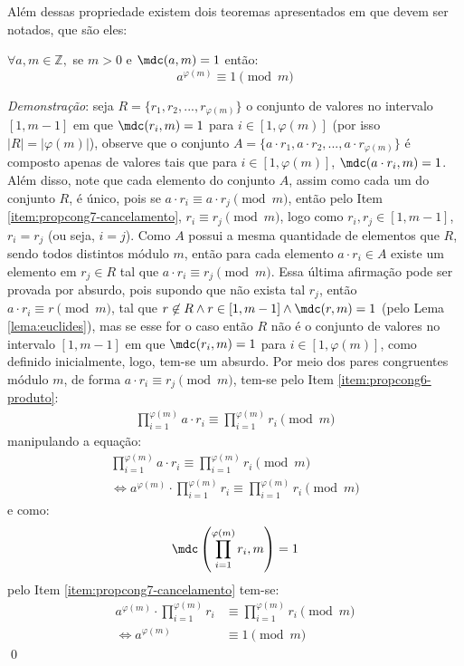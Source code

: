 Além dessas propriedade existem dois teoremas apresentados em \cite[p.~49-50]{book:2399854} que devem ser notados, que são eles:

\begin{teorema}
\label{eq : euler-fermat}
$\forall a, m \in \mathbb{Z},$ se  $ m > 0$  e $\mdc(a,m) = 1$ então:
    \begin{equation*}
        a^{\varphi(m)} \equiv 1 \pmod{m}
    \end{equation*}
\end{teorema}

\noindent
\textit{Demonstração}: seja $R = \{r_1, r_2, ..., r_{\varphi(m)}\}$ o conjunto de valores no intervalo $[1, m-1]$ em que $\mdc(r_i, m) = 1$ para $i \in [1, \varphi(m)]$ (por isso $|R| = |\varphi(m)|$), observe que o conjunto $A = \{a \cdot r_1, a \cdot r_2, ..., a \cdot r_{\varphi(m)}\}$ é composto apenas de valores tais que para $i \in [1, \varphi(m)]$, $\mdc(a \cdot r_i, m) = 1$. Além disso, note que cada elemento do conjunto $A$, assim como cada um do conjunto $R$, é único, pois se $a \cdot r_i \equiv a \cdot r_j \pmod{m}$, então pelo Item \ref{item:propcong7-cancelamento}, $r_i \equiv r_j \pmod{m}$, logo como $r_i, r_j \in [1, m-1]$, $r_i = r_j$ (ou seja, $i = j$). Como $A$ possui a mesma quantidade de elementos que $R$, sendo todos distintos módulo $m$, então para cada elemento $a \cdot r_i \in A$ existe um elemento em $r_j \in R$ tal que $a \cdot r_i \equiv r_j \pmod{m}$. Essa última afirmação pode ser provada por absurdo, pois supondo que não exista tal $r_j$, então $a \cdot r_i \equiv r \pmod{m}$, tal que $r \not\in R \land r \in [1, m-1] \land \mdc(r, m) = 1$ (pelo Lema \ref{lema:euclides}), mas se esse for o caso então $R$ não é o conjunto de valores no intervalo $[1, m-1]$ em que $\mdc(r_i, m) = 1$ para $i \in [1, \varphi(m)]$, como definido inicialmente, logo, tem-se um absurdo.
Por meio dos pares congruentes módulo $m$, de forma $a \cdot r_i \equiv r_j \pmod{m}$, tem-se pelo Item \ref{item:propcong6-produto}:
\begin{align*}
    \prod_{i = 1}^{\varphi(m)} a \cdot r_i \equiv \prod_{i = 1}^{\varphi(m)} r_i \pmod{m}
\end{align*}
manipulando a equação:
\begin{align*}
    \prod_{i = 1}^{\varphi(m)} a \cdot r_i \equiv \prod_{i = 1}^{\varphi(m)} r_i \pmod{m}
    \\
    \Longleftrightarrow a^{\varphi(m)} \cdot \prod_{i = 1}^{\varphi(m)} r_i \equiv \prod_{i = 1}^{\varphi(m)} r_i \pmod{m}
\end{align*}
e como:
\begin{equation*}
    \mdc\left(\prod_{i = 1}^{\varphi(m)} r_i, m\right) = 1
\end{equation*}
pelo Item \ref{item:propcong7-cancelamento} tem-se:
\begin{align*}
    a^{\varphi(m)} \cdot \prod_{i = 1}^{\varphi(m)} r_i & \equiv \prod_{i = 1}^{\varphi(m)} r_i \pmod{m}
    \\
    \Longleftrightarrow a^{\varphi(m)} & \equiv 1 \pmod{m} 
\end{align*} \qed

